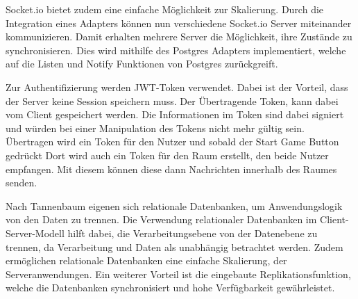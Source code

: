 \documentclass[
]{article}
\begin{document}
Socket.io bietet zudem eine einfache Möglichkeit zur Skalierung. Durch die Integration
eines Adapters können nun verschiedene Socket.io Server miteinander kommunizieren.
Damit erhalten mehrere Server die Möglichkeit, ihre Zustände zu synchronisieren.
Dies wird mithilfe des Postgres Adapters implementiert, welche auf die Listen und Notify
Funktionen von Postgres zurückgreift. \cite[]{postgres-adapter}

Zur Authentifizierung werden JWT-Token verwendet. Dabei ist der Vorteil, dass der Server keine Session speichern muss.
Der Übertragende Token, kann dabei vom Client gespeichert werden. Die Informationen im Token sind
dabei signiert und würden bei einer Manipulation des Tokens nicht mehr gültig sein.
Übertragen wird ein Token für den Nutzer und sobald der Start Game Button gedrückt 
Dort wird auch 
ein Token für den Raum erstellt, den beide Nutzer empfangen.
Mit diesem können diese dann Nachrichten innerhalb des Raumes senden.

Nach Tannenbaum eigenen sich relationale Datenbanken, um Anwendungslogik von den Daten zu trennen.
\glqq Die Verwendung relationaler Datenbanken im Client-Server-Modell hilft dabei, 
die Verarbeitungsebene von der Datenebene zu trennen, da Verarbeitung und Daten als unabhängig betrachtet werden.\grqq{} \cite[S. 40 ff.]{tanenbaum2007distributed}
Zudem ermöglichen relationale Datenbanken eine einfache Skalierung, der Serveranwendungen.
Ein weiterer Vorteil ist die eingebaute Replikationsfunktion, welche die Datenbanken synchronisiert und hohe Verfügbarkeit gewährleistet.\cite[Chapter 27]{postgresql-high-availability}

\newpage
\end{document}

